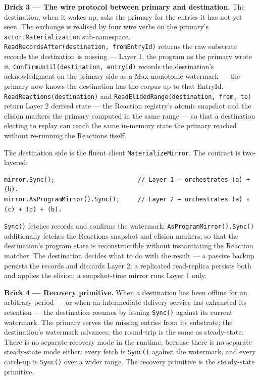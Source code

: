 \documentclass[
]{article}
\begin{document}
\textbf{Brick 3 --- The wire protocol between primary and destination.}
The destination, when it wakes up, asks the primary for the entries it
has not yet seen. The exchange is realised by four wire verbs on the
primary's \texttt{actor.Materialization} sub-namespace.
\texttt{ReadRecordsAfter(destination,\ fromEntryId)} returns the raw
substrate records the destination is missing --- Layer 1, the program as
the primary wrote it. \texttt{ConfirmUntil(destination,\ entryId)}
records the destination's acknowledgment on the primary side as a
Max-monotonic watermark --- the primary now knows the destination has
the corpus up to that EntryId. \texttt{ReadReactions(destination)} and
\texttt{ReadElidedRange(destination,\ from,\ to)} return Layer 2 derived
state --- the Reaction registry's atomic snapshot and the elision
markers the primary computed in the same range --- so that a destination
electing to replay can reach the same in-memory state the primary
reached without re-running the Reactions itself.

The destination side is the fluent client \texttt{MaterializeMirror}.
The contract is two-layered:

\begin{verbatim}
mirror.Sync();                       // Layer 1 — orchestrates (a) + (b).
mirror.AsProgramMirror().Sync();     // Layer 2 — orchestrates (a) + (c) + (d) + (b).
\end{verbatim}

\texttt{Sync()} fetches records and confirms the watermark;
\texttt{AsProgramMirror().Sync()} additionally fetches the Reactions
snapshot and elision markers, so that the destination's program state is
reconstructible without instantiating the Reaction matcher. The
destination decides what to do with the result --- a passive backup
persists the records and discards Layer 2; a replicated read-replica
persists both and applies the elision; a snapshot-time mirror runs Layer
1 only.

\textbf{Brick 4 --- Recovery primitive.} When a destination has been
offline for an arbitrary period --- or when an intermediate delivery
service has exhausted its retention --- the destination resumes by
issuing \texttt{Sync()} against its current watermark. The primary
serves the missing entries from its substrate; the destination's
watermark advances; the round-trip is the same as steady-state. There is
no separate recovery mode in the runtime, because there is no separate
steady-state mode either: every fetch is \texttt{Sync()} against the
watermark, and every catch-up is \texttt{Sync()} over a wider range. The
recovery primitive is the steady-state primitive.
\end{document}
